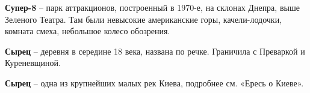 \medskip

\textbf{Супер-8} – парк аттракционов, построенный в 1970-е, на склонах Днепра, выше Зеленого Театра. Там были невысокие американские горы, качели-лодочки, комната смеха, небольшое колесо обозрения.\\

\medskip

\textbf{Сырец} – деревня в середине 18 века, названа по речке. Граничила с Преваркой и Куреневщиной.\\

\medskip

\textbf{Сырец} – одна из крупнейших малых рек Киева, подробнее см. «Ересь о Киеве».